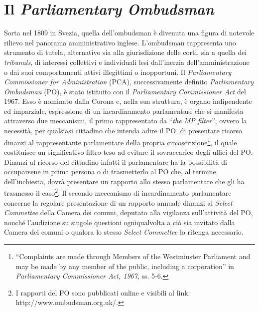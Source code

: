 \documentclass[12pt,it,a4paper,]{report}
\begin{document}
\hypertarget{il-parliamentary-ombudsman}{%
\section{\texorpdfstring{Il \emph{Parliamentary
Ombudsman}}{Il Parliamentary Ombudsman}}\label{il-parliamentary-ombudsman}}

Sorta nel 1809 in Svezia, quella dell'ombudsman è divenuta una figura di
notevole rilievo nel panorama amministrativo inglese. L'ombudsman
rappresenta uno strumento di tutela, alternativo sia alla giurisdizione
delle corti, sia a quella dei \emph{tribunals}, di interessi collettivi
e individuali lesi dall'inerzia dell'amministrazione o dai suoi
comportamenti attivi illegittimi o inopportuni. Il \emph{Parliamentary
Commissioner for Administration} (PCA), successivamente definito
\emph{Parliamentary Ombudsman} (PO), è stato istituito con il
\emph{Parliamentary Commissioner Act} del 1967. Esso è nominato dalla
Corona e, nella sua struttura, è organo indipendente ed imparziale,
espressione di un incardinamento parlamentare che si manifesta
attraverso due meccanismi, il primo rappresentato da ``\emph{the MP
filter}'', ovvero la necessità, per qualsiasi cittadino che intenda
adire il PO, di presentare ricorso dinanzi al rappresentante
parlamentare della propria circoscrizione\footnote{``Complaints are made
  through Members of the Westminster Parliament and may be made by any
  member of the public, including a corporation'' in \emph{Parliamentary
  Commissioner Act, 1967}, ss. 5-6.}, il quale costituisce un
significativo filtro teso ad evitare il sovraccarico degli uffici del
PO. Dinanzi al ricorso del cittadino infatti il parlamentare ha la
possibilità di occuparsene in prima persona o di trasmetterlo al PO che,
al termine dell'inchiesta, dovrà presentare un rapporto allo stesso
parlamentare che gli ha trasmesso il caso\footnote{I rapporti del PO
  sono pubblicati online e visibili al link:
  http://www.ombudsman.org.uk/.}. Il secondo meccanismo di
incardinamento parlamentare concerne la regolare presentazione di un
rapporto annuale dinanzi al \emph{Select Commettee} della Camera dei
comuni, deputato alla vigilanza sull'attività del PO, nonché l'audizione
su singole questioni ogniqualvolta a ciò sia invitato dalla Camera dei
comuni o qualora lo stesso \emph{Select Commettee} lo ritenga
necessario.
\end{document}
